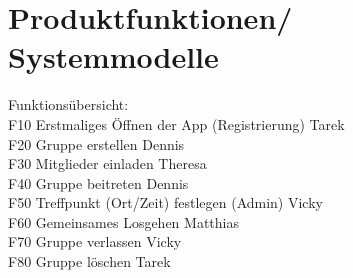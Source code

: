 \section{Produktfunktionen/ Systemmodelle}
Funktionsübersicht: \\
F10 Erstmaliges Öffnen der App (Registrierung) Tarek \\
F20 Gruppe erstellen Dennis \\
F30 Mitglieder einladen Theresa \\
F40 Gruppe beitreten Dennis \\
F50 Treffpunkt (Ort/Zeit) festlegen (Admin) Vicky \\
F60 Gemeinsames Losgehen Matthias \\
F70 Gruppe verlassen Vicky \\
F80 Gruppe löschen Tarek \\
